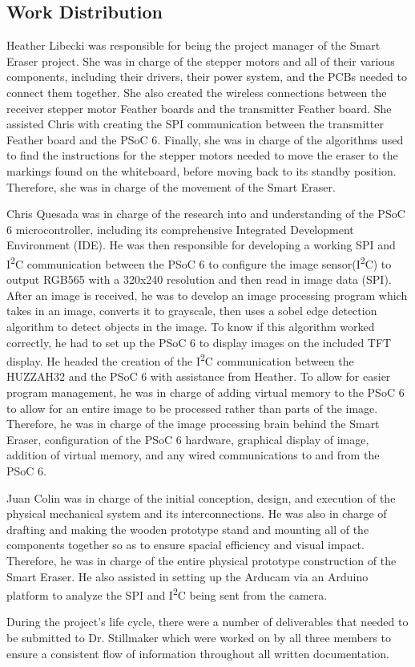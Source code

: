 \subsection{Work Distribution}
\setlength{\parindent}{2.5ex} Heather Libecki was responsible for being the project manager of the Smart Eraser project. She was in charge of the stepper motors and all of their various components, including their drivers, their power system, and the PCBs needed to connect them together. She also created the wireless connections between the receiver stepper motor Feather boards and the transmitter Feather board. She assisted Chris with creating the SPI communication between the transmitter Feather board and the PSoC 6. Finally, she was in charge of the algorithms used to find the instructions for the stepper motors needed to move the eraser to the markings found on the whiteboard, before moving back to its standby position. Therefore, she was in charge of the movement of the Smart Eraser. \par
\setlength{\parindent}{2.5ex} Chris Quesada was in charge of the research into and understanding of the PSoC 6 microcontroller, including its comprehensive Integrated Development Environment (IDE). He was then responsible for developing a working SPI and I\textsuperscript{2}C communication between the PSoC 6 to configure the image sensor(I\textsuperscript{2}C) to output RGB565 with a 320x240 resolution and then read in image data (SPI). After an image is received, he was to develop an image processing program which takes in an image, converts it to grayscale, then uses a sobel edge detection algorithm to detect objects in the image. To know if this algorithm worked correctly, he had to set up the PSoC 6 to display images on the included TFT display. He headed the creation of the I\textsuperscript{2}C communication between the HUZZAH32 and the PSoC 6 with assistance from Heather. To allow for easier program management, he was in charge of adding virtual memory to the PSoC 6 to allow for an entire image to be processed rather than parts of the image. Therefore, he was in charge of the image processing brain behind the Smart Eraser, configuration of the PSoC 6 hardware, graphical display of image, addition of virtual memory, and any wired communications to and from the PSoC 6.
 \par
\setlength{\parindent}{2.5ex} Juan Colin was in charge of the initial conception, design, and execution of the physical mechanical system and its interconnections. He was also in charge of drafting and making the wooden prototype stand and mounting all of the components together so as to ensure spacial efficiency and visual impact. Therefore, he was in charge of the entire physical prototype construction of the Smart Eraser. He also assisted in setting up the Arducam via an Arduino platform to analyze the SPI and I\textsuperscript{2}C being sent from the camera.
 \par
\setlength{\parindent}{2.5ex} During the project's life cycle, there were a number of deliverables that needed to be submitted to Dr. Stillmaker which were worked on by all three members to ensure a consistent flow of information throughout all written documentation.


